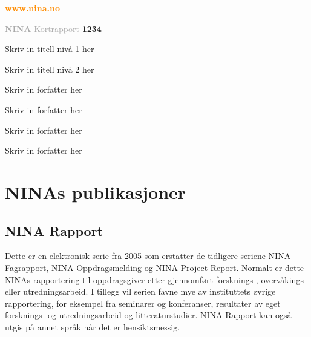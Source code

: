 \documentclass[11pt, a4paper]{article}
\newcommand{\shadOrange}[1]{\textcolor{darkOrange}{#1}}
\newcommand{\orange}[1]{\textcolor{lightOrange}{#1}}
\newcommand{\darkGrey}[1]{\textcolor{darkgrey}{#1}}
\begin{document}
\begin{titlepage}

\thispagestyle{titlefooter}
\begin{center}
\vspace{-1cm}
\LARGE\shadOrange{\textbf{www.nina.no}}
\end{center}
\vspace{2cm}

\hspace{-1cm}\Huge{\darkGrey{\textbf{NINA} Kortrapport}} \hspace{.7cm} \textbf{\orange{1234}}
\vspace{2cm}

\hspace{-1cm}\Huge{Skriv in titell nivå 1 her} \par\vspace{.5cm}
\hspace{-1cm}\huge{Skriv in titell nivå 2 her} \par\vspace{1cm}

\hspace{-1cm}\LARGE{Skriv in forfatter her} \par
\hspace{-1cm}\LARGE{Skriv in forfatter her} \par
\hspace{-1cm}\LARGE{Skriv in forfatter her} \par
\hspace{-1cm}\LARGE{Skriv in forfatter her} \par

\restoregeometry
\end{titlepage}

\cfoot{}
\section*{NINAs publikasjoner}

\subsection*{NINA Rapport}
Dette er en elektronisk serie fra 2005 som erstatter de tidligere seriene NINA Fagrapport, NINA Oppdragsmelding og NINA Project Report. Normalt er dette NINAs rapportering til oppdragsgiver etter gjennomført forsknings-, overvåkings- eller utredningsarbeid. I tillegg vil serien favne mye av instituttets øvrige rapportering, for eksempel fra seminarer og konferanser, resultater av eget forsknings- og utredningsarbeid og litteraturstudier. NINA Rapport kan også utgis på annet språk når det er hensiktsmessig.
\end{document}
